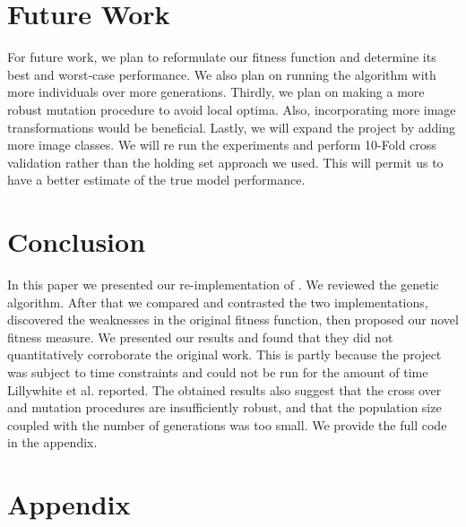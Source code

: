 \documentclass[conference]{IEEEtran}
\begin{document}
\section{Future Work}
For future work, we plan to reformulate our fitness function and determine its best and worst-case performance. We also plan on running the algorithm with more individuals over more generations. Thirdly, we plan on making a more robust mutation procedure to avoid local optima. Also, incorporating more image transformations would be beneficial. Lastly, we will expand the project by adding more image classes. We will re run the experiments and perform 10-Fold cross validation rather than the holding set approach we used. This will permit us to have a better estimate of the true model performance.
\section{Conclusion}
In this paper we presented our re-implementation of \cite{lillywhite2013feature}. We reviewed the genetic algorithm. After that we compared and contrasted the two implementations, discovered the weaknesses in the original fitness function, then proposed our novel fitness measure. We presented our results and found that they did not quantitatively corroborate the original work. This is partly because the project was subject to time constraints and could not be run for the amount of time Lillywhite et al. reported. The obtained results also suggest that the cross over and mutation procedures are insufficiently robust, and that the population size coupled with the number of generations was too small. We provide the full code in the appendix.
\section{Appendix}


\end{document}

